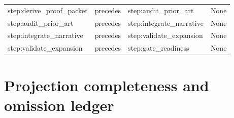 \documentclass[10pt,a4paper]{article}
\begin{document}
\begin{longtable}{@{}>{\raggedright\arraybackslash}p{.24\linewidth}>{\raggedright\arraybackslash}p{.12\linewidth}>{\raggedright\arraybackslash}p{.24\linewidth}>{\raggedright\arraybackslash}p{.20\linewidth}@{}}
step:\allowbreak{}derive\_\allowbreak{}proof\_\allowbreak{}packet & precedes & step:\allowbreak{}audit\_\allowbreak{}prior\_\allowbreak{}art & None\\
step:\allowbreak{}audit\_\allowbreak{}prior\_\allowbreak{}art & precedes & step:\allowbreak{}integrate\_\allowbreak{}narrative & None\\
step:\allowbreak{}integrate\_\allowbreak{}narrative & precedes & step:\allowbreak{}validate\_\allowbreak{}expansion & None\\
step:\allowbreak{}validate\_\allowbreak{}expansion & precedes & step:\allowbreak{}gate\_\allowbreak{}readiness & None\\
\bottomrule
\end{longtable}
\normalsize\endgroup
\section{Projection completeness and omission ledger}\label{app-dispositions}
\begingroup\setlength{\tabcolsep}{2pt}\small
\end{document}
